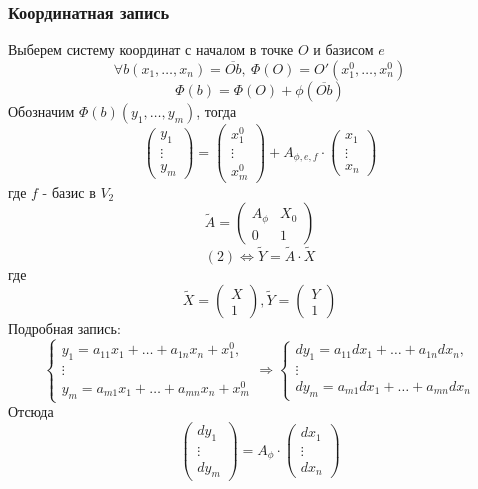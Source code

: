 \subsubsection*{Координатная запись}
Выберем систему координат с началом в точке $O$ и базисом $e$
\[\forall b(x_1,\dots,x_n)=\overline{Ob},\ \Phi(O)=O'(x_1^0,\dots,x_n^0)\]
\[\Phi(b)=\Phi(O)+\phi(\overline{Ob})\]
Обозначим $\Phi(b)(y_1,\dots,y_m)$, тогда
\[\begin{pmatrix}
    y_1\\
    \vdots\\
    y_m
\end{pmatrix}
=
\begin{pmatrix}
    x_1^0\\
    \vdots\\
    x_m^0
\end{pmatrix}
+A_{\phi,e,f}\cdot
\begin{pmatrix}
    x_1\\
    \vdots\\
    x_n
\end{pmatrix}
\]
где $f$ - базис в $V_2$
\[\widetilde{A}=\begin{pmatrix}
    A_{\phi} & X_0\\
    0 & 1
\end{pmatrix}
\]
\[(2) \Longleftrightarrow \widetilde{Y}=\widetilde{A}\cdot \widetilde{X}\]
где
\[
\widetilde{X}=\begin{pmatrix}
    X\\
    1
\end{pmatrix},
\widetilde{Y}=\begin{pmatrix}
    Y\\
    1
\end{pmatrix}
\]
Подробная запись:
\[\begin{cases}
    y_1=a_{11}x_1+\dots+a_{1n}x_n+x_1^0,\\
    \vdots\\
    y_m=a_{m1}x_1+\dots+a_{mn}x_n+x_m^0
\end{cases}
\Longrightarrow
\begin{cases}
    dy_1=a_{11}dx_1+\dots+a_{1n}dx_n,\\
    \vdots\\
    dy_m=a_{m1}dx_1+\dots+a_{mn}dx_n
\end{cases}
\]
Отсюда
\[\begin{pmatrix}
    dy_1\\
    \vdots\\
    dy_m
\end{pmatrix}
=A_{\phi}\cdot
\begin{pmatrix}
    dx_1\\
    \vdots\\
    dx_n
\end{pmatrix}
\]
